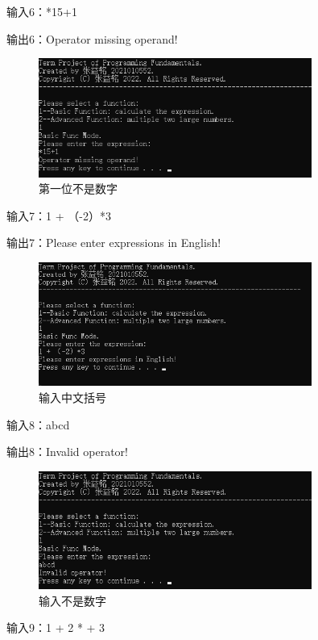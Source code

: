 \documentclass[a4paper, 11pt, UTF8]{ctexart}
\begin{document}
输入6：*15+1

输出6：Operator missing operand!

\begin{figure}[H]
    \centering
    \caption{第一位不是数字}
    \includegraphics[width=0.8\textwidth]{t6.png}    
\end{figure}

输入7：1 + （-2）*3

输出7：Please enter expressions in English!

\begin{figure}[H]
    \centering
    \caption{输入中文括号}
    \includegraphics[width=0.8\textwidth]{t7.png}    
\end{figure}

输入8：abcd

输出8：Invalid operator!

\begin{figure}[H]
    \centering
    \caption{输入不是数字}
    \includegraphics[width=0.8\textwidth]{t8.png}    
\end{figure}

输入9：1 + 2 * + 3
\end{document}
